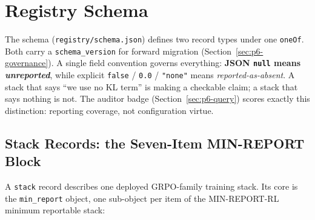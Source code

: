 \section{Registry Schema}
\label{sec:p6-schema}

The schema (\texttt{registry/schema.json}) defines two record types under one
\texttt{oneOf}. Both carry a \texttt{schema_version} for forward migration
(Section~\ref{sec:p6-governance}). A single field convention governs
everything: \textbf{JSON \texttt{null} means \emph{unreported}}, while explicit
\texttt{false} / \texttt{0.0} / \texttt{"none"} means
\emph{reported-as-absent}. A stack that says ``we use no KL term'' is making a
checkable claim; a stack that says nothing is not. The auditor badge
(Section~\ref{sec:p6-query}) scores exactly this distinction: reporting
coverage, not configuration virtue.

\subsection{Stack Records: the Seven-Item MIN-REPORT Block}
\label{sec:p6-schema-stack}
A \texttt{stack} record describes one deployed GRPO-family training stack. Its
core is the \texttt{min_report} object, one sub-object per item of the
MIN-REPORT-RL minimum reportable stack:

